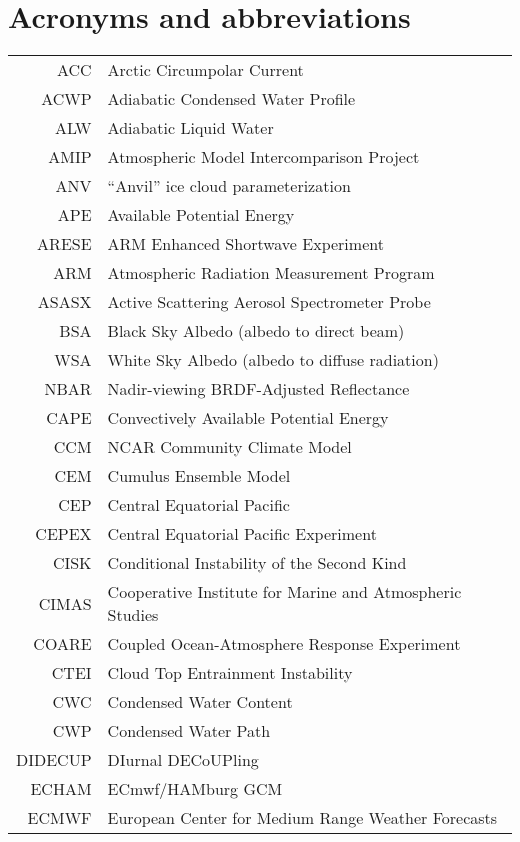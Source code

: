 

\chapter{Acronyms and abbreviations}\label{app:abb}
\begin{longtable}[l]{r l}
ACC & Arctic Circumpolar Current \\
ACWP & Adiabatic Condensed Water Profile \\
ALW & Adiabatic Liquid Water \\
AMIP & Atmospheric Model Intercomparison Project \\
ANV & ``Anvil'' ice cloud parameterization \\
APE & Available Potential Energy \\
ARESE & ARM Enhanced Shortwave Experiment \\
ARM & Atmospheric Radiation Measurement Program \\
ASASX & Active Scattering Aerosol Spectrometer Probe \\
BSA & Black Sky Albedo (albedo to direct beam) \\
WSA & White Sky Albedo (albedo to diffuse radiation) \\
NBAR & Nadir-viewing BRDF-Adjusted Reflectance \\
CAPE & Convectively Available Potential Energy \\
CCM & NCAR Community Climate Model \\
CEM & Cumulus Ensemble Model \\
CEP & Central Equatorial Pacific \\
CEPEX & Central Equatorial Pacific Experiment \\
CISK & Conditional Instability of the Second Kind \\
CIMAS & Cooperative Institute for Marine and Atmospheric Studies \\
COARE & Coupled Ocean-Atmosphere Response Experiment \\
CTEI & Cloud Top Entrainment Instability \\
CWC & Condensed Water Content \\
CWP & Condensed Water Path \\
DIDECUP & DIurnal DECoUPling \\
ECHAM & ECmwf/HAMburg GCM \\
ECMWF & European Center for Medium Range Weather Forecasts \\

\end{longtable}
